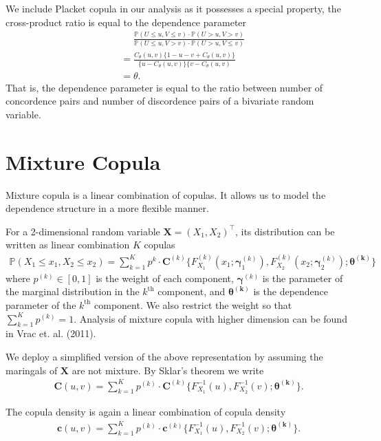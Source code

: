 \documentclass[square]{article} %
\begin{document}
    We include Placket copula in our analysis as it possesses a special property,
    the cross-product ratio is equal to the dependence parameter
    \begin{align}
        &\phantom{=} \frac{\mathbb{P}(U \leq u, V \leq v) \cdot \mathbb{P}(U > u, V > v)}
        {\mathbb{P}(U \leq u, V > v) \cdot \mathbb{P}(U > u, V \leq v)}\\
        &= \frac{C_\theta(u,v)\{1-u-v+C_\theta(u,v)\}}{\{u-C_\theta(u,v)\}\{v-C_\theta(u,v)}\\
        &= \theta.
        \end{align}
    That is, the dependence parameter is equal to the ratio between number of concordence pairs and number of discordence pairs of a bivariate random variable.
    \section{Mixture Copula}\label{sec:mixture-copula}
    Mixture copula is a linear combination of copulas.
    It allows us to model the dependence structure in a more flexible manner.

    For a 2-dimensional random variable $\bm{X}=(X_1,X_2)^\intercal$,
    its distribution can be written as linear combination $K$ copulas
    \begin{align}
        \mathbb{P}(X_1 \leq x_1, X_2 \leq x_2) = \sum_{k=1}^K p^k \cdot \bm{C}^{(k)}\{F^{(k)}_{X_1}(x_1;\bm{\gamma}^{(k)}_1),
        F^{(k)}_{X_2}(x_2;\bm{\gamma}^{(k)}_2); \bm{\theta^{(k)}}\}
        \end{align}
    where $p^{(k)} \in [0,1]$ is the weight of each component,
    $\bm{\gamma}^{(k)}$ is the parameter of the marginal distribution in the $k^\text{th}$ component,
    and $\bm{\theta^{(k)}}$ is the dependence parameter of the $k^\text{th}$ component.
    We also restrict the weight so that $\sum_{k=1}^K p^{(k)}=1$.
    Analysis of mixture copula with higher dimension can be found in Vrac et. al. (2011).

    We deploy a simplified version of the above representation by assuming the maringals of $\bm{X}$ are not mixture.
    By Sklar's theorem we write
    \begin{align}
        \bm{C}(u,v)= \sum_{k=1}^K p^{(k)} \cdot \bm{C}^{(k)}\{F^{-1}_{X_1}(u),
        F^{-1}_{X_2}(v); \bm{\theta^{(k)}}\}.
        \end{align}

    The copula density is again a linear combination of copula density
    \begin{align}
        \bm{c}(u,v)= \sum_{k=1}^K p^{(k)} \cdot \bm{c}^{(k)}\{F^{-1}_{X_1}(u),
        F^{-1}_{X_2}(v); \bm{\theta^{(k)}}\}.
        \end{align}
\end{document}
